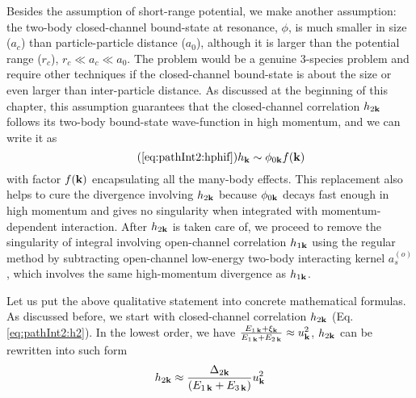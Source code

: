 Besides the assumption of short-range potential, we make another assumption:  the  two-body closed-channel bound-state at resonance, $\phi$, is much smaller in size ($a_{c}$) than particle-particle distance ($a_{0}$), although it is  larger than the potential range ($r_{c}$),    $r_{c}\ll{}a_{c}\ll{}a_{0}$.  The problem would be a genuine 3-species problem and require other techniques if the closed-channel bound-state is about the size  or even larger than  inter-particle distance. As discussed at the beginning of this chapter, this assumption guarantees that the closed-channel correlation $h_{2\mathbf{k}}$ follows its two-body bound-state wave-function in high momentum, and  we can write it as 
\begin{equation}\tag{\ref{eq:pathInt2:hphif}}
h_{\vk}\sim\phi_{0\vk}f(\vk)
\end{equation}
with factor $f(\mathbf{k})$ encapsulating all the many-body effects. This replacement also helps to  cure the divergence involving $h_{2\mathbf{k}}$ because $\phi_{0\mathbf{k}}$ decays fast enough in high momentum and gives no singularity when integrated with momentum-dependent interaction.   After $h_{2\mathbf{k}}$ is taken care of, we proceed to remove the singularity of integral involving open-channel correlation $h_{1\mathbf{k}}$ using the regular method by subtracting open-channel low-energy two-body interacting kernel $a_{s}^{(o)}$, which involves  the same high-momentum divergence as $h_{1\mathbf{k}}$. 



Let us put the above qualitative statement into concrete mathematical formulas.   As discussed before, we start with  closed-channel correlation $h_{2\mathbf{k}}$ (Eq. \ref{eq:pathInt2:h2}). In the lowest order, we have $\frac{E_{1\,\mathbf{k}}+\xi_{\mathbf{k}}}{E_{1\,\mathbf{k}}+E_{2\,\mathbf{k}}}\approx{}u_{\mathbf{k}}^{2}$, $h_{2\mathbf{k}}$ can be rewritten into such form
\begin{equation}\label{eq:pathInt2:h2D2}
 h_{2\mathbf{k}}\approx\frac{\Delta_{2\mathbf{k}}}{(E_{1\,\mathbf{k}}+E_{3\,\mathbf{k}})}u_{\mathbf{k}}^{2}
\end{equation}

